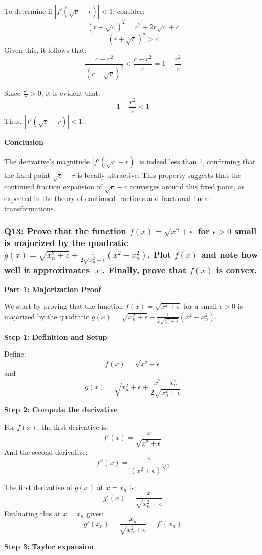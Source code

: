 \documentclass[8pt]{article}
\begin{document}
To determine if \(|f'(\sqrt{c} - r)| < 1\), consider:
\[ (r + \sqrt{c})^2 = r^2 + 2r\sqrt{c} + c \]
\[ (r + \sqrt{c})^2 > c \]
Given this, it follows that:
\[ \frac{c - r^2}{(r + \sqrt{c})^2} < \frac{c - r^2}{c} = 1 - \frac{r^2}{c} \]

Since \(\frac{r^2}{c} > 0\), it is evident that:
\[ 1 - \frac{r^2}{c} < 1 \]
Thus, \(|f'(\sqrt{c} - r)| < 1\).

\textbf{Conclusion}

The derivative's magnitude \(|f'(\sqrt{c} - r)|\) is indeed less than 1, confirming that the fixed point \(\sqrt{c} - r\) is locally attractive. This property suggests that the continued fraction expansion of \(\sqrt{c} - r\) converges around this fixed point, as expected in the theory of continued fractions and fractional linear transformations.

\subsubsection*{Q13: Prove that the function \( f(x) = \sqrt{x^2 + \epsilon} \) for \( \epsilon > 0 \) small is majorized by the quadratic \( g(x) = \sqrt{x_n^2 + \epsilon} + \frac{1}{2\sqrt{x_n^2 + \epsilon}} (x^2 - x_n^2) \). Plot \( f(x) \) and note how well it approximates \(|x|\). Finally, prove that \( f(x) \) is convex.}

\textbf{Part 1: Majorization Proof}

We start by proving that the function \( f(x) = \sqrt{x^2 + \epsilon} \) for a small \( \epsilon > 0 \) is majorized by the quadratic \( g(x) = \sqrt{x_n^2 + \epsilon} + \frac{1}{2\sqrt{x_n^2 + \epsilon}} (x^2 - x_n^2) \).

\textbf{Step 1: Definition and Setup}

Define:
\[ f(x) = \sqrt{x^2 + \epsilon} \]
and
\[ g(x) = \sqrt{x_n^2 + \epsilon} + \frac{x^2 - x_n^2}{2\sqrt{x_n^2 + \epsilon}} \]

\textbf{Step 2: Compute the derivative}

For \( f(x) \), the first derivative is:
\[ f'(x) = \frac{x}{\sqrt{x^2 + \epsilon}} \]
And the second derivative:
\[ f''(x) = \frac{\epsilon}{(x^2 + \epsilon)^{3/2}} \]

The first derivative of \( g(x) \) at \( x = x_n \) is:
\[ g'(x) = \frac{x}{\sqrt{x_n^2 + \epsilon}} \]
Evaluating this at \( x = x_n \) gives:
\[ g'(x_n) = \frac{x_n}{\sqrt{x_n^2 + \epsilon}} = f'(x_n) \]

\textbf{Step 3: Taylor expansion}
\end{document}
